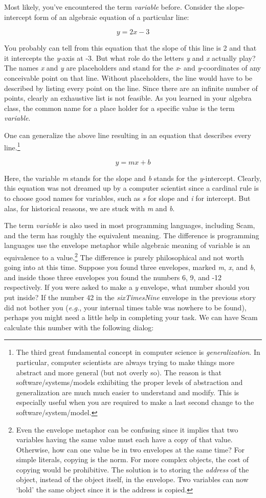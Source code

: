 Most likely,
you've encountered the term {\it variable} before.
Consider the
slope-intercept form of an algebraic equation of a particular line:

    \[  y = 2x - 3 \]

You probably can tell from this equation that the slope of this line
is 2 and that it intercepts the {\it y}-axis at -3.
But what role do
the letters {\it y} and {\it x} actually play?  The names {\it x} and {\it y}
are placeholders and stand for the {\it x}- and {\it y}-coordinates of any
conceivable point on that line.
Without placeholders,
the line would
have to be described by listing every point on the line.
Since there
are an infinite number of points,
clearly an exhaustive list is not
feasible.
As you learned in your algebra class,
the common name for a
place holder for a specific value is the term {\it variable}.

One can generalize the above line resulting in an equation that describes
every line.\footnote{
The third great fundamental concept in computer science
is {\it generalization}.
In particular,
computer scientists are always trying to make things
more abstract and more general (but not overly so).
The reason is that
software/systems/models exhibiting the proper levels of abstraction and
generalization are much much easier to understand and modify.
This is
especially useful when you are required to make a last second
change to the software/system/model.
}

    \[  y = mx + b \]

Here,
the variable {\it m} stands for the slope and {\it b} stands for the
{\it y}-intercept.
Clearly,
this equation was not dreamed up by a computer
scientist since a cardinal rule is to choose good names for variables,
such as {\it s} for slope and {\it i} for intercept.
But alas,
for historical reasons,
we are stuck with {\it m} and {\it b}.

The term {\it variable} is also used in most programming languages,
including
Scam,
and the term has roughly the equivalent meaning.
The difference is
programming languages use the envelope metaphor
while algebraic meaning of variable is an equivalence to a value.\footnote{
Even the envelope metaphor can be confusing since it
implies that two variables having the same value must
each have a copy of that value. Otherwise, how can one value
be in two envelopes at the same time? For simple literals, copying is
the norm.
For more complex objects, the cost of copying would
be prohibitive.
The solution is to storing the {\it address} of the object,
instead of the object itself, in the envelope. Two variables can
now `hold' the same object since it is the address is copied.
}
The difference is purely philosophical and not worth going into at this
time.
Suppose you found three envelopes,
marked {\it m}, {\it x}, and {\it b},
and inside
those three envelopes you found the numbers 6, 9, and -12 respectively.
If
you were asked to make a {\it y} envelope,
what number should you put inside?
If
the number 42 in the {\it sixTimesNine} envelope in the previous story did not
bother you ({\it e.g.}, your internal times table was nowhere to be found),
perhaps you might need a little help in completing your task.
We can
have Scam calculate this number with the following dialog:

